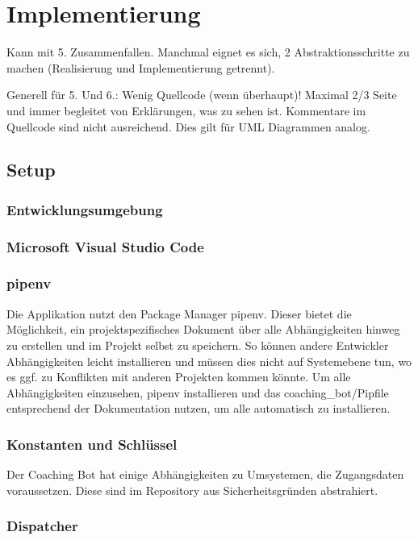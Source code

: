 \chapter{Implementierung}

Kann mit 5. Zusammenfallen. Manchmal eignet es sich, 2 Abstraktionsschritte zu machen (Realisierung und Implementierung getrennt).  
  
Generell für 5. Und 6.: Wenig Quellcode (wenn überhaupt)! Maximal 2/3 Seite und immer begleitet von Erklärungen, was zu sehen ist. Kommentare im Quellcode sind nicht ausreichend. Dies gilt für UML Diagrammen analog.  


\section{Setup}
\subsection{Entwicklungsumgebung}

\subsection{Microsoft Visual Studio Code}

\subsection{pipenv}
Die Applikation nutzt den Package Manager pipenv. Dieser bietet die Möglichkeit, ein projektspezifisches Dokument über alle Abhängigkeiten hinweg zu erstellen und im Projekt selbst zu speichern. So können andere Entwickler Abhängigkeiten leicht installieren und müssen dies nicht auf Systemebene tun, wo es ggf. zu Konflikten mit anderen Projekten kommen könnte. 
Um alle Abhängigkeiten einzusehen, pipenv \cite{pipenv} installieren und das coaching_bot/Pipfile entsprechend der Dokumentation nutzen, um alle automatisch zu installieren.

\subsection{Konstanten und Schlüssel}

Der Coaching Bot hat einige Abhängigkeiten zu Umsystemen, die Zugangsdaten voraussetzen. Diese sind im Repository \cite{repo} aus Sicherheitsgründen abstrahiert. 


\subsection{Dispatcher}

